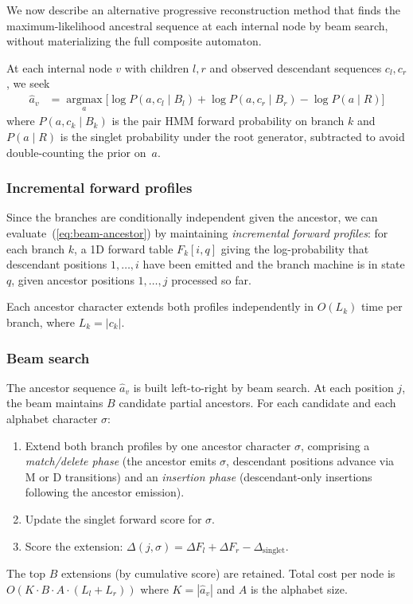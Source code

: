 We now describe an alternative progressive reconstruction method
that finds the maximum-likelihood ancestral sequence at each internal node
by beam search, without materializing the full composite automaton.

At each internal node $v$ with children $l,r$ and observed descendant sequences
$c_l, c_r$, we seek
\begin{align}
\hat{a}_v &= \operatorname*{argmax}_{a} \bigl[ \log P(a, c_l \mid B_l) + \log P(a, c_r \mid B_r) - \log P(a \mid R) \bigr]
\label{eq:beam-ancestor}
\end{align}
where $P(a, c_k \mid B_k)$ is the pair HMM forward probability on branch $k$
and $P(a \mid R)$ is the singlet probability under the root generator,
subtracted to avoid double-counting the prior on~$a$.

\subsubsection{Incremental forward profiles}

Since the branches are conditionally independent given the ancestor,
we can evaluate~(\ref{eq:beam-ancestor}) by maintaining
\emph{incremental forward profiles}: for each branch $k$, a 1D forward table
$F_k[i, q]$ giving the log-probability that descendant positions $1,\ldots,i$
have been emitted and the branch machine is in state $q$,
given ancestor positions $1,\ldots,j$ processed so far.

Each ancestor character extends both profiles independently in $O(L_k)$ time
per branch, where $L_k = |c_k|$.

\subsubsection{Beam search}

The ancestor sequence $\hat{a}_v$ is built left-to-right by beam search.
At each position $j$, the beam maintains $B$ candidate partial ancestors.
For each candidate and each alphabet character $\sigma$:
\begin{enumerate}
\item Extend both branch profiles by one ancestor character $\sigma$,
  comprising a \emph{match/delete phase} (the ancestor emits $\sigma$,
  descendant positions advance via M or D transitions)
  and an \emph{insertion phase} (descendant-only insertions following the
  ancestor emission).
\item Update the singlet forward score for $\sigma$.
\item Score the extension:
  $\Delta(j, \sigma) = \Delta F_{l} + \Delta F_{r} - \Delta_{\mathrm{singlet}}$.
\end{enumerate}
The top $B$ extensions (by cumulative score) are retained.
Total cost per node is $O(K \cdot B \cdot A \cdot (L_l + L_r))$
where $K = |\hat{a}_v|$ and $A$ is the alphabet size.

